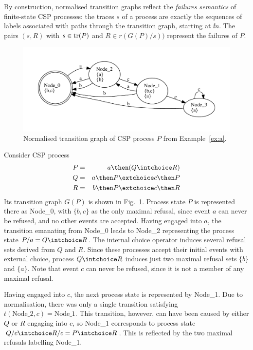 By construction, normalised transition graphs reflect the \emph{failures semantics} of finite-state CSP processes: 
the traces $s$ of a process are exactly the sequences of labels associated 
with paths through the transition graph, 
starting at $\ii n$. The pairs $(s,R)$ with $s\in\text{tr}(P)$ and 
$R\in r(G(P)/s))$ represent the failures of $P$.


 \begin{figure}
 \begin{center}
\includegraphics[width=\textwidth]{q0.pdf}
\end{center}
\caption{Normalised transition graph of CSP process $P$ from Example~\ref{ex:a}.}
 \label{fig:tga}
 \end{figure}



\begin{example}\label{ex:a}
Consider CSP process 
\begin{eqnarray*}
P & = & a \then (Q\intchoice R)
\\
Q & = & a \then P \extchoice c \then P
\\
R & = & b \then P \extchoice c \then R
\end{eqnarray*}
Its transition graph $G(P)$ is shown in Fig.~\ref{fig:tga}. Process state $P$ is represented there as Node\_0, with $\{ b,c\}$ as the only maximal refusal, since event $a$ can never be refused, and no other events are accepted. Having engaged into $a$, the transition emanating from Node\_0 leads to Node\_2 representing  the process state 
$P/a = Q\intchoice R$. The internal choice operator induces several refusal sets derived from $Q$ and $R$. Since these processes accept their initial events with external choice, 
process $Q\intchoice R$ induces just two maximal refusal sets $\{b\}$ and
$\{a\}$. Note that event $c$ can never be refused, since it is not a member of any
maximal refusal. 

Having engaged into $c$, the next process state is represented by Node\_1. Due to normalisation, there was only a single transition satisfying 
$t(\text{Node\_2},c) = \text{Node\_1}$. This transition, however, can have been caused 
by either $Q$ or $R$ engaging into $c$, so Node\_1 corresponds to process state
$Q/c \intchoice R/c = P \intchoice R$. This is reflected by the two maximal refusals
labelling Node\_1. 
\xbox
\end{example}

